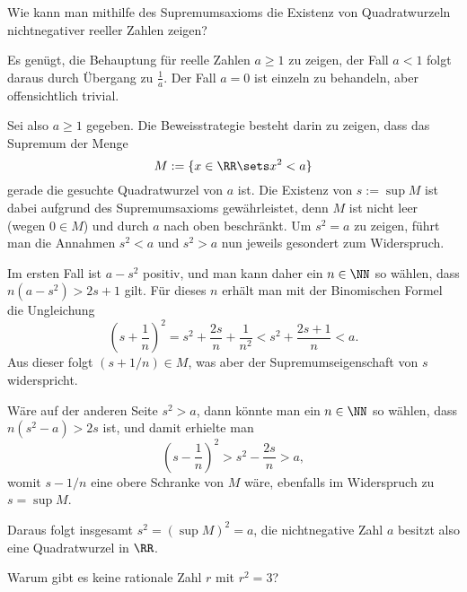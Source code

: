 \begin{frage}
  Wie kann man mithilfe des Supremumsaxioms die Existenz von Quadratwurzeln 
  nichtnegativer reeller Zahlen zeigen?
\end{frage}

\begin{antwort}
  Es genügt, die Behauptung für reelle Zahlen $a \ge 1$ zu zeigen, 
  der Fall $a<1$ folgt daraus durch Übergang zu $\frac{1}{a}$. Der  
  Fall $a=0$ ist einzeln zu behandeln, aber offensichtlich 
  trivial. 

  Sei also $a\ge 1$ gegeben. Die Beweisstrategie 
  besteht darin zu zeigen, dass das Supremum der Menge  
  \[
  M:=\{ x \in \RR\sets x^2<a \}
  \] 
  gerade die gesuchte Quadratwurzel von $a$ ist. 
  Die Existenz von $s:=\sup M$ ist dabei 
  aufgrund des Supremumsaxioms gewährleistet, 
  denn $M$ ist nicht leer (wegen $0\in M$) und durch $a$ 
  nach oben beschränkt. Um $s^2=a$ zu zeigen, führt man die Annahmen 
  $s^2<a$ und $s^2>a$ nun jeweils gesondert zum Widerspruch. 

  Im ersten Fall ist $a-s^2$ positiv, und man kann daher ein 
  $n\in\NN$ so wählen, dass $n(a-s^2) > 2s+1$ gilt. Für dieses 
  $n$ erhält man mit der Binomischen Formel die Ungleichung 
  \[
  \left( s+\frac{1}{n} \right)^2 = s^2 + \frac{2s}{n} + \frac{1}{n^2} 
  < s^2 + \frac{2s+1}{n} < a.
  \] 
  Aus dieser folgt $(s+1/n) \in M$, was aber der Supremumseigenschaft von 
  $s$ widerspricht.   

  Wäre auf der anderen Seite 
  $s^2>a$, dann könnte man ein $n\in\NN$ so wählen, dass 
  $n(s^2-a)>2s$ ist, und damit erhielte man 
  \[
  \left( s-\frac{1}{n}\right)^2  > s^2 -\frac{2s}{n} >a,
  \] 
  womit $s-1/n$ eine obere Schranke von $M$ wäre, ebenfalls im 
  Widerspruch zu $s=\sup M$. 

  Daraus folgt insgesamt $s^2=(\sup M)^2=a$, die 
  nichtnegative Zahl $a$ besitzt also 
  eine Quadratwurzel in $\RR$. 
  \AntEnd
\end{antwort}


\begin{frage} 
  Warum gibt es keine rationale Zahl $r$ mit $r^2=3$?
\end{frage}

